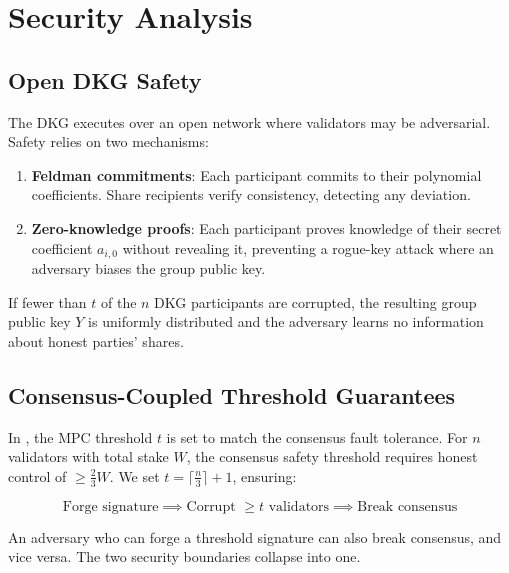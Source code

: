 \section{Security Analysis}

\label{sec:security}

\subsection{Open DKG Safety}

The DKG executes over an open network where validators may be adversarial. Safety relies on two mechanisms:

\begin{enumerate}
\item \textbf{Feldman commitments}: Each participant commits to their polynomial coefficients. Share recipients verify consistency, detecting any deviation.
\item \textbf{Zero-knowledge proofs}: Each participant proves knowledge of their secret coefficient $a_{i,0}$ without revealing it, preventing a rogue-key attack where an adversary biases the group public key.
\end{enumerate}

\begin{proposition}
If fewer than $t$ of the $n$ DKG participants are corrupted, the resulting group public key $Y$ is uniformly distributed and the adversary learns no information about honest parties' shares.
\end{proposition}

\subsection{Consensus-Coupled Threshold Guarantees}

In \TChain{}, the MPC threshold $t$ is set to match the consensus fault tolerance. For $n$ validators with total stake $W$, the consensus safety threshold requires honest control of $\geq \frac{2}{3}W$. We set $t = \lceil \frac{n}{3} \rceil + 1$, ensuring:

\begin{equation}
\text{Forge signature} \implies \text{Corrupt } \geq t \text{ validators} \implies \text{Break consensus}
\end{equation}

An adversary who can forge a threshold signature can also break consensus, and vice versa. The two security boundaries collapse into one.

